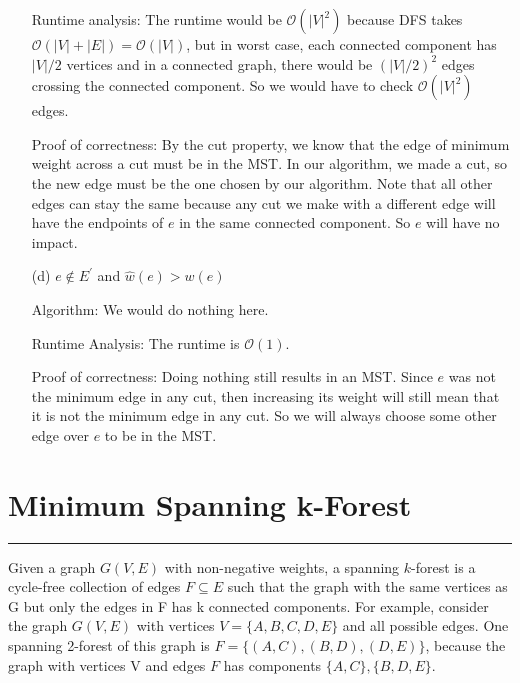 \documentclass{article}
\begin{document}
\begin{itemize}
\begin{answer}
            Runtime analysis: The runtime would be $\mathcal{O}(\lvert V \rvert^{2})$ because DFS takes $\mathcal{O}(\lvert V \rvert + \lvert E \rvert) = \mathcal{O}(\lvert V \rvert)$, but in worst case, each connected component has $\lvert V \rvert / 2$ vertices and in a connected graph, there would be $(\lvert V \rvert / 2)^{2}$ edges crossing the connected component. So we would have to check $\mathcal{O}(\lvert V \rvert^{2})$ edges.

            Proof of correctness: By the cut property, we know that the edge of minimum weight across a cut must be in the MST. In our algorithm, we made a cut, so the new edge must be the one chosen by our algorithm. Note that all other edges can stay the same because any cut we make with a different edge will have the endpoints of $e$ in the same connected component. So $e$ will have no impact.
        \end{answer}

    \item [(d)] $e \notin E^{\prime}$ and $\hat{w}(e) > w(e)$ 
        \begin{answer}
            Algorithm: We would do nothing here. 

            Runtime Analysis: The runtime is $\mathcal{O}(1)$.

            Proof of correctness: Doing nothing still results in an MST. Since $e$ was not the minimum edge in any cut, then increasing its weight will still mean that it is not the minimum edge in any cut. So we will always choose some other edge over $e$ to be in the MST.
        \end{answer}
\end{itemize}

\newpage
\section*{Minimum Spanning k-Forest}
\hrule

Given a graph $G(V, E)$ with non-negative weights, a spanning $k$-forest is a cycle-free collection of edges $F \subseteq E$ such that the graph with the same vertices as G but only the edges in F has k connected components. For example, consider the graph $G(V, E)$ with vertices $V = \{A, B, C, D, E\}$ and all possible edges. One spanning 2-forest of this graph is $F = \{(A, C), (B, D), (D, E)\}$, because the graph with vertices V and edges $F$ has components $\{A, C\}, \{B, D, E\}$.
\end{document}
